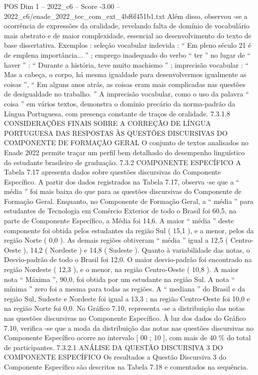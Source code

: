 \begin{textsample}{POS Dim 1 – 2022\_c6 – Score -3.00 – 2022\_c6/enade\_2022\_tec\_com\_ext\_4bf6f451b1.txt}
Além disso, observou -se a ocorrência de expressões da oralidade, revelando falta de domínio de vocabulário mais abstrato e de maior complexidade, essencial ao desenvolvimento do texto de base dissertativa.
Exemplos : seleção vocabular indevida : “ Em pleno século 21 é de emplena importância... ” ; emprego inadequado do verbo “ ter ” no lugar de “ haver ” : “ Durante a história, teve muito machismo ” ; imprecisão vocabular : “ Mas a cabeça, o corpo, há mesma igualdade para desenvolvermos igualmente as coisas ”, “ Em alguns anos atrás, as coisas eram mais complicadas nas questões de desigualdade no trabalho. ” A imprecisão vocabular, como o uso da palavra “ coisa ” em vários textos, demonstra o domínio precário da norma-padrão da Língua Portuguesa, com presença constante de traços de oralidade. 7.3.1.8 CONSIDERAÇÕES FINAIS SOBRE A CORREÇÃO DE LÍNGUA PORTUGUESA DAS RESPOSTAS ÀS QUESTÕES DISCURSIVAS DO COMPONENTE DE FORMAÇÃO GERAL O conjunto de textos analisados no Enade 2022 permite traçar um perfil bem detalhado do desempenho linguístico do estudante brasileiro de graduação. 7.3.2 COMPONENTE ESPECÍFICO A Tabela 7.17 apresenta dados sobre questões discursivas do Componente Específico.
A partir dos dados registrados na Tabela 7.17, observa -se que a “ média ” foi mais baixa do que para as questões discursivas do Componente de Formação Geral.
Enquanto, no Componente de Formação Geral, a “ média ” para estudantes de Tecnologia em Comércio Exterior de todo o Brasil foi 60,5, na parte de Componente Específico, a Média foi 14,6.
A maior “ média ” deste componente foi obtida pelos estudantes da região Sul ( 15,1 ), e a menor, pelos da região Norte ( 0,0 ).
As demais regiões obtiveram “ média ” igual a 12,5 ( Centro-Oeste ), 14,2 ( Nordeste ) e 14,8 ( Sudeste ).
Quanto à variabilidade das notas, o Desvio-padrão de todo o Brasil foi 12,0.
O maior desvio-padrão foi encontrado na região Nordeste ( 12,3 ), e o menor, na região Centro-Oeste ( 10,8 ).
A maior nota “ Máxima ”, 90,0, foi obtida por um estudante na região Sul.
A nota “ mínima ” zero foi a mesma para todas as regiões.
A “ mediana ” do Brasil e da região Sul, Sudeste e Nordeste foi igual a 13,3 ; na região Centro-Oeste foi 10,0 e na região Norte foi 0,0.
No Gráfico 7.10, representa -se a distribuição das notas nas questões discursivas no Componente Específico.
À luz dos dados do Gráfico 7.10, verifica -se que a moda da distribuição das notas nas questões discursivas no Componente Específico ocorre no intervalo [ 00 ; 10 ], com mais de 40 \% do total de participantes. 7.3.2.1 ANÁLISE DA QUESTÃO DISCURSIVA 3 DO COMPONENTE ESPECÍFICO Os resultados a Questão Discursiva 3 do Componente Específico são descritos na Tabela 7.18 e comentados na sequência.

\end{textsample}
